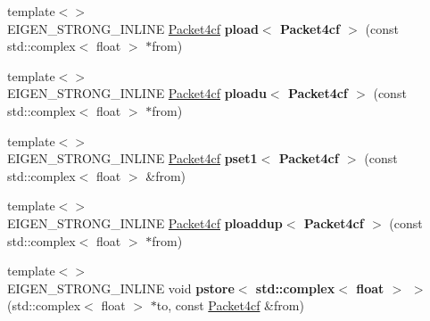 \begin{DoxyCompactItemize}
\item 
\mbox{\label{namespace_eigen_1_1internal_add5c0f2bec03d6b5a3e9f2925baeff74}} 
{\footnotesize template$<$$>$ }\\E\+I\+G\+E\+N\+\_\+\+S\+T\+R\+O\+N\+G\+\_\+\+I\+N\+L\+I\+NE \hyperlink{struct_eigen_1_1internal_1_1_packet4cf}{Packet4cf} {\bfseries pload$<$ Packet4cf $>$} (const std\+::complex$<$ float $>$ $\ast$from)
\item 
\mbox{\label{namespace_eigen_1_1internal_a0af5b2c10a48eb64aad66d0ae8aac9eb}} 
{\footnotesize template$<$$>$ }\\E\+I\+G\+E\+N\+\_\+\+S\+T\+R\+O\+N\+G\+\_\+\+I\+N\+L\+I\+NE \hyperlink{struct_eigen_1_1internal_1_1_packet4cf}{Packet4cf} {\bfseries ploadu$<$ Packet4cf $>$} (const std\+::complex$<$ float $>$ $\ast$from)
\item 
\mbox{\label{namespace_eigen_1_1internal_a66a8682c156a7f9315db7004261bcac3}} 
{\footnotesize template$<$$>$ }\\E\+I\+G\+E\+N\+\_\+\+S\+T\+R\+O\+N\+G\+\_\+\+I\+N\+L\+I\+NE \hyperlink{struct_eigen_1_1internal_1_1_packet4cf}{Packet4cf} {\bfseries pset1$<$ Packet4cf $>$} (const std\+::complex$<$ float $>$ \&from)
\item 
\mbox{\label{namespace_eigen_1_1internal_a9641211c8ee7110d30ddf79ea34502ed}} 
{\footnotesize template$<$$>$ }\\E\+I\+G\+E\+N\+\_\+\+S\+T\+R\+O\+N\+G\+\_\+\+I\+N\+L\+I\+NE \hyperlink{struct_eigen_1_1internal_1_1_packet4cf}{Packet4cf} {\bfseries ploaddup$<$ Packet4cf $>$} (const std\+::complex$<$ float $>$ $\ast$from)
\item 
\mbox{\label{namespace_eigen_1_1internal_a30f9ae2f25dc4bf8d133703b69204a59}} 
{\footnotesize template$<$$>$ }\\E\+I\+G\+E\+N\+\_\+\+S\+T\+R\+O\+N\+G\+\_\+\+I\+N\+L\+I\+NE void {\bfseries pstore$<$ std\+::complex$<$ float $>$ $>$} (std\+::complex$<$ float $>$ $\ast$to, const \hyperlink{struct_eigen_1_1internal_1_1_packet4cf}{Packet4cf} \&from)
\item 
\mbox{\label{namespace_eigen_1_1internal_ac36932da6516b5e7c73d1f5f478f9a92}} 

\end{DoxyCompactItemize}
